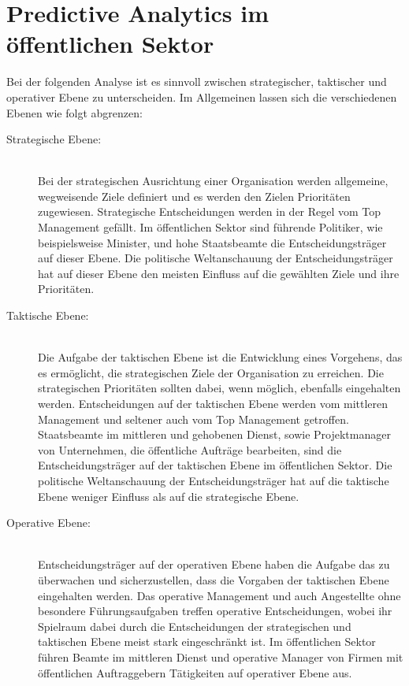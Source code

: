 \chapter{Predictive Analytics im öffentlichen Sektor}

Bei der folgenden Analyse ist es sinnvoll zwischen strategischer, taktischer und
operativer Ebene zu unterscheiden. Im Allgemeinen lassen sich die verschiedenen
Ebenen wie folgt abgrenzen:

\begin{description}

\item[Strategische Ebene:] \hfill \\
Bei der strategischen Ausrichtung einer Organisation werden allgemeine, wegweisende Ziele definiert
und es werden den Zielen Prioritäten zugewiesen. Strategische Entscheidungen werden in 
der Regel vom Top Management gefällt. Im öffentlichen Sektor sind führende Politiker, 
wie beispielsweise Minister, und hohe Staatsbeamte die Entscheidungsträger auf dieser Ebene.
Die politische Weltanschauung der Entscheidungsträger hat auf dieser Ebene den 
meisten Einfluss auf die gewählten Ziele und ihre Prioritäten.

\item[Taktische Ebene:] \hfill \\
Die Aufgabe der taktischen Ebene ist die Entwicklung eines Vorgehens, das es
ermöglicht, die strategischen Ziele der Organisation zu erreichen. Die strategischen
Prioritäten sollten dabei, wenn möglich, ebenfalls eingehalten werden. Entscheidungen
auf der taktischen Ebene werden vom mittleren Management und seltener auch vom Top
Management getroffen. Staatsbeamte im mittleren und gehobenen Dienst, sowie Projektmanager von
Unternehmen, die öffentliche Aufträge bearbeiten, sind die Entscheidungsträger auf der taktischen
Ebene im öffentlichen Sektor. Die politische Weltanschauung der Entscheidungsträger hat 
auf die taktische Ebene weniger Einfluss als auf die strategische Ebene. 

\item[Operative Ebene:] \hfill \\
Entscheidungsträger auf der operativen Ebene haben die Aufgabe das \grqq{}
zu überwachen und sicherzustellen, dass die Vorgaben der taktischen Ebene eingehalten werden.
Das operative Management und auch Angestellte ohne besondere Führungsaufgaben treffen operative
Entscheidungen, wobei ihr Spielraum dabei durch die Entscheidungen der strategischen und taktischen
Ebene meist stark eingeschränkt ist. Im öffentlichen Sektor führen Beamte im mittleren Dienst und 
operative Manager von Firmen mit öffentlichen Auftraggebern Tätigkeiten auf operativer Ebene aus.


\end{description}

